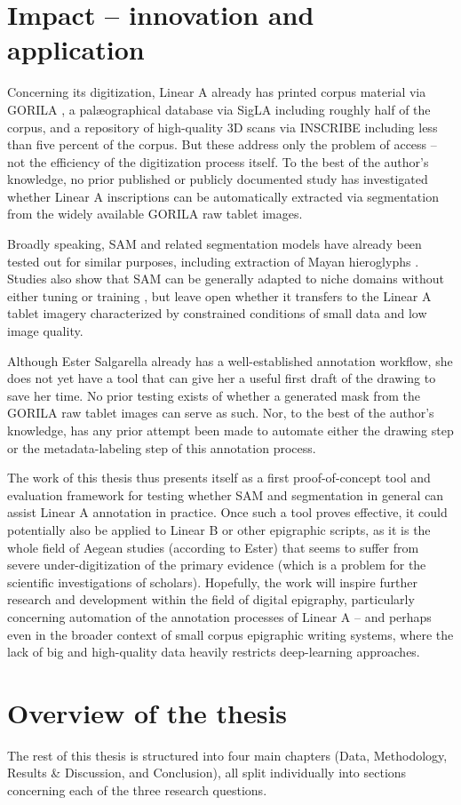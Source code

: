 \section{Impact -- innovation and application}
Concerning its digitization, Linear A already has printed corpus material via \acs{GORILA} \parencite{EtudesCretoises21}, a palæographical database via SigLA \parencite{SalgarellaCastellanSigLA2020} including roughly half of the corpus, and a repository of high-quality 3D scans via INSCRIBE \parencite{INSCRIBE3D} including less than five percent of the corpus.
But these address only the problem of access -- not the efficiency of the digitization process itself.
To the best of the author's knowledge, no prior published or publicly documented study has investigated whether Linear A inscriptions can be automatically extracted via segmentation from the widely available \acs{GORILA} raw tablet images.

Broadly speaking, \acs{SAM} and related segmentation models have already been tested out for similar purposes, including extraction of Mayan hieroglyphs \parencite{MayaSAM}.
Studies also show that \acs{SAM} can be generally adapted to niche domains without either tuning or training \parencite{fatesam}, but leave open whether it transfers to the Linear A tablet imagery characterized by constrained conditions of small data and low image quality.

Although Ester Salgarella already has a well-established annotation workflow, she does not yet have a tool that can give her a useful first draft of the drawing to save her time.
No prior testing exists of whether a generated mask from the \acs{GORILA} raw tablet images can serve as such.
Nor, to the best of the author's knowledge, has any prior attempt been made to automate either the drawing step or the metadata-labeling step of this annotation process.

The work of this thesis thus presents itself as a first proof-of-concept tool and evaluation framework for testing whether \acs{SAM} and segmentation in general can assist Linear A annotation in practice.
Once such a tool proves effective, it could potentially also be applied to Linear B or other epigraphic scripts, as it is the whole field of Aegean studies (according to Ester) that seems to suffer from severe under-digitization of the primary evidence (which is a problem for the scientific investigations of scholars).
Hopefully, the work will inspire further research and development within the field of digital epigraphy, particularly concerning automation of the annotation processes of Linear A -- and perhaps even in the broader context of small corpus epigraphic writing systems, where the lack of big and high-quality data heavily restricts deep-learning approaches.

\section{Overview of the thesis}
The rest of this thesis is structured into four main chapters (Data, Methodology, Results \& Discussion, and Conclusion), all split individually into sections concerning each of the three research questions.
